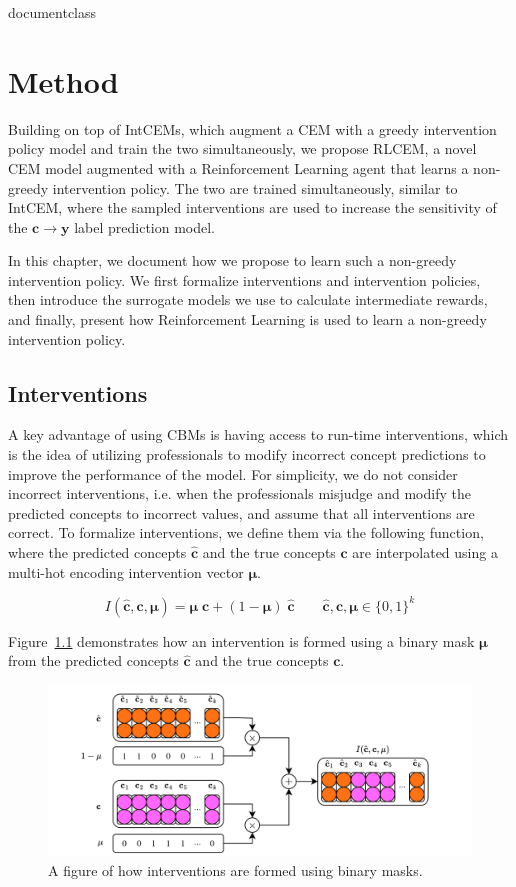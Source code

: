 \csname documentclass

\chapter{Method}
Building on top of IntCEMs, which augment a CEM
with a greedy intervention policy model and train the two simultaneously,
we propose RLCEM,
a novel CEM model augmented with a Reinforcement Learning agent
that learns a non-greedy intervention policy.
The two are trained simultaneously, similar to IntCEM, 
where the sampled interventions are used to increase the sensitivity of the
$\mathbf{c} \to \mathbf{y}$ label prediction model.

In this chapter, we document how we propose 
to learn such a non-greedy intervention policy.
We first
formalize interventions and intervention policies,
then introduce the surrogate models we use
to calculate intermediate rewards,
and finally, present how Reinforcement Learning is used 
to learn a non-greedy intervention policy.
\section{Interventions}
A key advantage of using CBMs is having access to 
run-time interventions, which is the idea of utilizing professionals
to modify incorrect concept predictions to improve the 
performance of the model.
For simplicity, we do not consider incorrect interventions, 
i.e. when the professionals misjudge and modify
 the predicted concepts to incorrect values,
and assume that
all interventions are correct. To formalize interventions, we define
them via the following function, where
the predicted concepts $\hat{\mathbf{c}}$ and the true concepts $\mathbf{c}$ are interpolated
using a multi-hot encoding intervention vector $\bm{\mu}$.

\[I(\hat{\mathbf{c}}, \mathbf{c}, \bm{\mu}) = 
\bm{\mu} \; \mathbf{c} + (1 - \bm{\mu}) \; \hat{\mathbf{c}} \qquad \hat{\mathbf{c}}, \mathbf{c}, \bm{\mu} \in \{0, 1\}^k\]

Figure~\ref{fig:interventions} demonstrates how an intervention
is formed using 
a binary mask $\bm{\mu}$ from the predicted concepts $\hat{\mathbf{c}}$ and the true concepts $\mathbf{c}$.

\begin{figure}[!h]
    \centering
    \includegraphics[width=\textwidth]{figs/method/interventions.png}
    \caption{A figure of how interventions are formed using binary masks.}
    \label{fig:interventions}
\end{figure}

